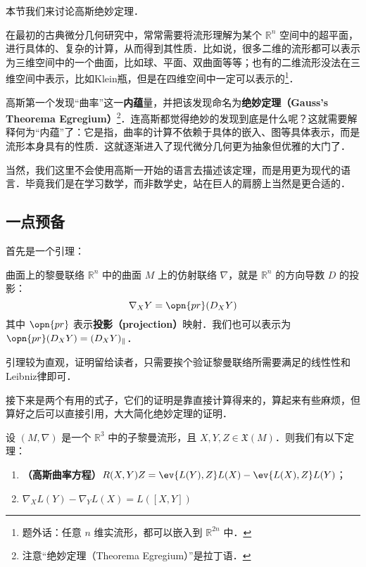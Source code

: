 


本节我们来讨论高斯绝妙定理．

在最初的古典微分几何研究中，常常需要将流形理解为某个 $\mathbb{R}^n$ 空间中的超平面，进行具体的、复杂的计算，从而得到其性质．比如说，很多二维的流形都可以表示为三维空间中的一个曲面，比如球、平面、双曲面等等；也有的二维流形没法在三维空间中表示，比如Klein瓶，但是在四维空间中一定可以表示的\footnote{题外话：任意 $n$ 维实流形，都可以嵌入到 $\mathbb{R}^{2n}$ 中．}．

高斯第一个发现“曲率”这一\textbf{内蕴}量，并把该发现命名为\textbf{绝妙定理（Gauss's Theorema Egregium）}\footnote{注意“绝妙定理（Theorema Egregium）”是拉丁语．}．连高斯都觉得绝妙的发现到底是什么呢？这就需要解释何为“内蕴”了：它是指，曲率的计算不依赖于具体的嵌入、图等具体表示，而是流形本身具有的性质．这就逐渐进入了现代微分几何更为抽象但优雅的大门了．

当然，我们这里不会使用高斯一开始的语言去描述该定理，而是用更为现代的语言．毕竟我们是在学习数学，而非数学史，站在巨人的肩膀上当然是更合适的．

\subsection{一点预备}

首先是一个引理：

\begin{lemma}{曲面上的黎曼联络}\label{Egreg_lem1}
$\mathbb{R}^n$ 中的曲面 $M$ 上的仿射联络 $\nabla$，就是 $\mathbb{R}^n$ 的方向导数 $D$ 的投影：
\begin{equation}
\nabla_XY=\opn{pr}(D_XY)
\end{equation}
其中 $\opn{pr}$ 表示\textbf{投影（projection）}映射．我们也可以表示为 $\opn{pr}(D_XY)=(D_XY)_\parallel$．
\end{lemma}

引理较为直观，证明留给读者，只需要挨个验证黎曼联络所需要满足的线性性和Leibniz律即可．

接下来是两个有用的式子，它们的证明是靠直接计算得来的，算起来有些麻烦，但算好之后可以直接引用，大大简化绝妙定理的证明．

\begin{theorem}{}\label{Egreg_the1}
设 $(M, \nabla)$ 是一个 $\mathbb{R}^3$ 中的子黎曼流形，且 $X, Y, Z\in\mathfrak{X}(M)$．则我们有以下定理：
\begin{enumerate}
\item \textbf{（高斯曲率方程）}$R(X, Y)Z=\ev{L(Y), Z}L(X)-\ev{L(X), Z}L(Y)$；
\item $\nabla_XL(Y)-\nabla_YL(X)=L([X, Y])$
\end{enumerate}
\end{theorem}

